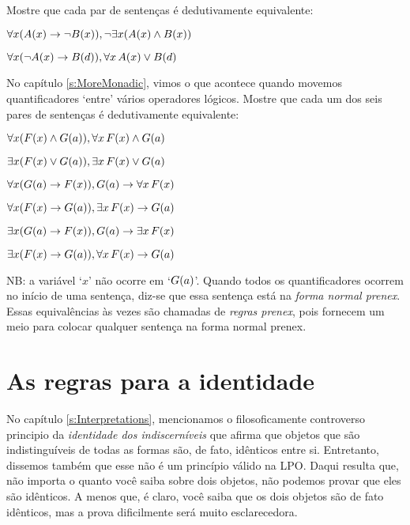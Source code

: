 \problempart
Mostre que cada par de senten\c cas \'e dedutivamente equivalente:
\begin{earg}
\item $\forall x (\mathord{A}(x)\rightarrow \neg \mathord{B}(x)), \neg\exists x(\mathord{A}(x) \wedge \mathord{B}(x))$
\item $\forall x (\neg\mathord{A}(x)\rightarrow \mathord{B}(d)), \forall x\,\mathord{A}(x) \vee \mathord{B}(d)$
\end{earg}

\problempart
No cap\'itulo \ref{s:MoreMonadic}, vimos o que acontece quando movemos quantificadores `entre'  v\'arios operadores l\'ogicos. Mostre que cada um dos seis pares de senten\c cas \'e dedutivamente equivalente:
\begin{earg}
\item $\forall x(\mathord{F}(x) \wedge \mathord{G}(a)), \forall x\,\mathord{F}(x) \wedge \mathord{G}(a)$
\item $\exists x(\mathord{F}(x) \vee \mathord{G}(a)), \exists x\,\mathord{F}(x) \vee \mathord{G}(a)$
\item $\forall x(\mathord{G}(a) \rightarrow \mathord{F}(x)), \mathord{G}(a) \rightarrow \forall x\,\mathord{F}(x)$
\item $\forall x(\mathord{F}(x) \rightarrow \mathord{G}(a)), \exists x\,\mathord{F}(x) \rightarrow \mathord{G}(a)$
\item $\exists x(\mathord{G}(a) \rightarrow \mathord{F}(x)), \mathord{G}(a) \rightarrow \exists x\,\mathord{F}(x)$
\item $\exists x(\mathord{F}(x) \rightarrow \mathord{G}(a)), \forall x\,\mathord{F}(x) \rightarrow \mathord{G}(a)$
\end{earg}
NB: a vari\'avel `$x$'  n\~ao ocorre em `$\mathord{G}(a)$'. Quando todos os quantificadores ocorrem no in\'icio de uma senten\c ca, diz-se que essa senten\c ca est\'a na  \emph{forma normal prenex}. Essas equival\^encias \`as vezes s\~ao chamadas de  \emph{regras prenex}, pois fornecem um meio para colocar qualquer senten\c ca na forma normal prenex.


\chapter{As regras para a identidade}
 No cap\'itulo \ref{s:Interpretations},  mencionamos o filosoficamente controverso   principio da \emph{identidade dos indiscern\'iveis} que afirma que objetos que s\~ao indistingu\'iveis de todas as formas s\~ao, de fato, id\^enticos entre si. Entretanto, dissemos tamb\'em que esse n\~ao \'e um princ\'ipio v\'alido na LPO.  Daqui resulta que, n\~ao importa o quanto voc\^e saiba sobre dois objetos, n\~ao podemos provar que eles s\~ao id\^enticos. A menos que, \'e claro, voc\^e saiba que os dois objetos s\~ao de fato id\^enticos, mas a prova dificilmente ser\'a muito esclarecedora.


